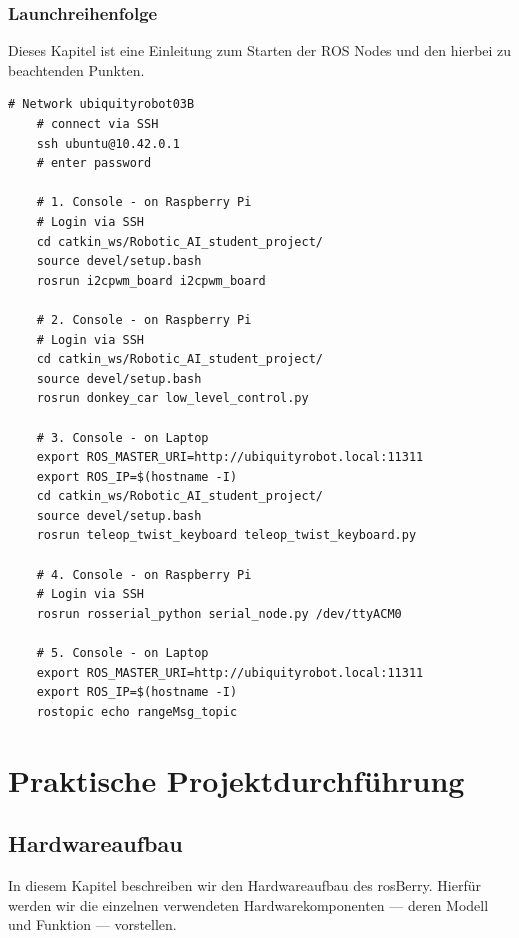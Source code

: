 \documentclass[conference]{IEEEtran}
\begin{document}
\pagebreak
\subsubsection{Launchreihenfolge}%

Dieses Kapitel ist eine Einleitung zum Starten der ROS Nodes und den hierbei zu beachtenden Punkten.

\begin{lstlisting}[label={list:first},caption=Sample rosBash code.]
	# Network ubiquityrobot03B
	# connect via SSH
	ssh ubuntu@10.42.0.1
	# enter password

	# 1. Console - on Raspberry Pi
	# Login via SSH
	cd catkin_ws/Robotic_AI_student_project/
	source devel/setup.bash
	rosrun i2cpwm_board i2cpwm_board

	# 2. Console - on Raspberry Pi
	# Login via SSH
	cd catkin_ws/Robotic_AI_student_project/
	source devel/setup.bash
	rosrun donkey_car low_level_control.py

	# 3. Console - on Laptop 
	export ROS_MASTER_URI=http://ubiquityrobot.local:11311
	export ROS_IP=$(hostname -I)
	cd catkin_ws/Robotic_AI_student_project/
	source devel/setup.bash
	rosrun teleop_twist_keyboard teleop_twist_keyboard.py

	# 4. Console - on Raspberry Pi
	# Login via SSH
	rosrun rosserial_python serial_node.py /dev/ttyACM0

	# 5. Console - on Laptop
	export ROS_MASTER_URI=http://ubiquityrobot.local:11311
	export ROS_IP=$(hostname -I)
	rostopic echo rangeMsg_topic
\end{lstlisting}

\section{Praktische Projektdurchführung}


\subsection{Hardwareaufbau}%
In diesem Kapitel beschreiben wir den Hardwareaufbau des rosBerry.
Hierfür werden wir die einzelnen verwendeten Hardwarekomponenten — deren Modell und Funktion — vorstellen.
\end{document}
